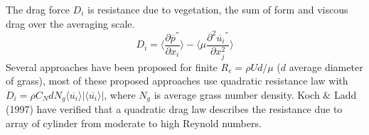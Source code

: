 \documentclass[12pt]{report}   %
\renewcommand{\bar}{\overline}
\begin{document}
 The drag force $D_i$ is resistance due to vegetation, the sum of form and viscous drag over the averaging scale.
 \begin{equation}
  D_i = \langle \frac{\partial \overline{p}^{''}}{\partial x_i} \rangle - \langle \mu \frac{\partial^2 \bar{u_i}^{''} }{\partial x_j^2} \rangle
 \end{equation}
Several approaches have been proposed for finite $R_e = \rho U d/\mu$ ($d$ average diameter of grass), most of these proposed approaches use quadratic resistance law with $D_i = \rho C_N d N_g \langle \overline{u_i}\rangle |\langle \overline{u_i} \rangle|$, where $N_g$ is average grass number density. Koch $\&$ Ladd (1997) have verified that a quadratic drag law describes the resistance due to array of cylinder from moderate to high Reynold numbers.
\end{document}
